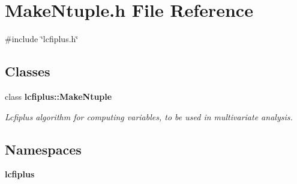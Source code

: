 \section{Make\+Ntuple.\+h File Reference}
\label{MakeNtuple_8h}
{\ttfamily \#include \char`\"{}lcfiplus.\+h\char`\"{}}\newline
\subsection*{Classes}
\begin{DoxyCompactItemize}
\item 
class \textbf{ lcfiplus\+::\+Make\+Ntuple}
\begin{DoxyCompactList}\small\item\em Lcfiplus algorithm for computing variables, to be used in multivariate analysis. \end{DoxyCompactList}\end{DoxyCompactItemize}
\subsection*{Namespaces}
\begin{DoxyCompactItemize}
\item 
 \textbf{ lcfiplus}
\end{DoxyCompactItemize}
